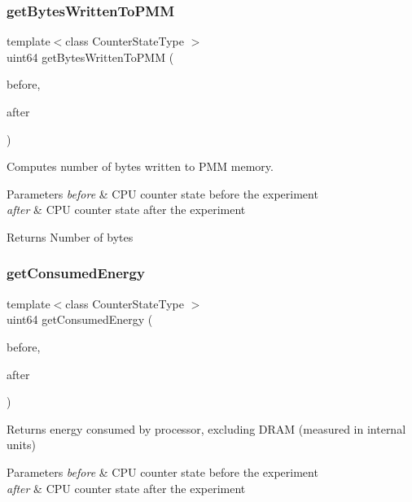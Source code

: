 \subsubsection{get\+Bytes\+Written\+To\+P\+MM}
{\footnotesize\ttfamily template$<$class Counter\+State\+Type $>$ \\
uint64 get\+Bytes\+Written\+To\+P\+MM (\begin{DoxyParamCaption}\item[{const Counter\+State\+Type \&}]{before,  }\item[{const Counter\+State\+Type \&}]{after }\end{DoxyParamCaption})\hspace{0.3cm}{\ttfamily [friend]}}



Computes number of bytes written to P\+MM memory. 


\begin{DoxyParams}{Parameters}
{\em before} & C\+PU counter state before the experiment \\
\hline
{\em after} & C\+PU counter state after the experiment \\
\hline
\end{DoxyParams}
\begin{DoxyReturn}{Returns}
Number of bytes 
\end{DoxyReturn}
\mbox{\label{classUncoreCounterState_a054b949f09283093e1923affa4e58ae8}} 
\subsubsection{get\+Consumed\+Energy}
{\footnotesize\ttfamily template$<$class Counter\+State\+Type $>$ \\
uint64 get\+Consumed\+Energy (\begin{DoxyParamCaption}\item[{const Counter\+State\+Type \&}]{before,  }\item[{const Counter\+State\+Type \&}]{after }\end{DoxyParamCaption})\hspace{0.3cm}{\ttfamily [friend]}}



Returns energy consumed by processor, excluding D\+R\+AM (measured in internal units) 


\begin{DoxyParams}{Parameters}
{\em before} & C\+PU counter state before the experiment \\
\hline
{\em after} & C\+PU counter state after the experiment \\
\hline
\end{DoxyParams}
\mbox{\label{classUncoreCounterState_a71af0766460ef7dd3d138ec0d0924eda}} 

